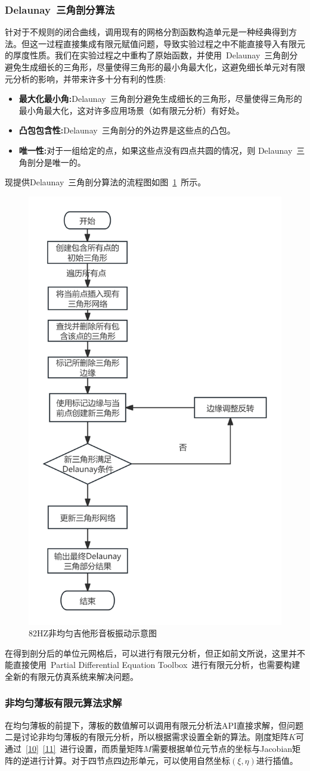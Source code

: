 \documentclass[withoutpreface,bwprint]{cumcmthesis} %
\begin{document}
\subsubsection{Delaunay~三角剖分算法}
针对于不规则的闭合曲线，调用现有的网格分割函数构造单元是一种经典得到方法。但这一过程直接集成有限元赋值问题，导致实验过程之中不能直接导入有限元的厚度性质。我们在实验过程之中重构了原始函数，并使用~Delaunay~三角剖分避免生成细长的三角形，尽量使得三角形的最小角最大化，这避免细长单元对有限元分析的影响，并带来许多十分有利的性质:
\begin{itemize}
    \item \textbf{最大化最小角:}Delaunay~三角剖分避免生成细长的三角形，尽量使得三角形的最小角最大化，这对许多应用场景（如有限元分析）有好处。
    \item \textbf{凸包包含性:}Delaunay~三角剖分的外边界是这些点的凸包。
    \item \textbf{唯一性:}对于一组给定的点，如果这些点没有四点共圆的情况，则 Delaunay~三角剖分是唯一的。
\end{itemize}

现提供Delaunay~三角剖分算法的流程图如图~\ref{Dfigure}~所示。
\begin{figure}[H]
\centering %
\includegraphics[width=0.5\linewidth,height=0.75\linewidth]{CUMCMThesis-master/figures/Dfigure.pdf}\caption{82HZ非均匀吉他形音板振动示意图}
\label{Dfigure}
\end{figure}
在得到剖分后的单位元网格后，可以进行有限元分析，但正如前文所说，这里并不能直接使用~Partial Differential Equation Toolbox~进行有限元分析，也需要构建全新的有限元仿真系统来解决问题。
\subsubsection{非均匀薄板有限元算法求解}
在均匀薄板的前提下，薄板的数值解可以调用有限元分析法API直接求解，但问题二是讨论非均匀薄板的有限元分析，所以根据需求设置全新的算法。刚度矩阵$K$可通过~\eqref{10}~\eqref{11}~进行设置，而质量矩阵$M$需要根据单位元节点的坐标与Jacobian矩阵的逆进行计算。对于四节点四边形单元，可以使用自然坐标$(\xi ,\eta)$进行插值。
\end{document}
